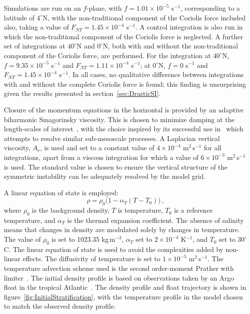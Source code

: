 Simulations are run on an $f$-plane, with $f = 1.01 \times 10 ^{-5}$ s$^{-1}$, corresponding to a latitude of $4^\circ$N, with the non-traditional component of the Coriolis force included also, taking a value of $F_{NT} = 1.45 \times 10^{-4}$ s$^{-1}$. A control integration is also run in which the non-traditional component of the Coriolis force is neglected. A further set of integrations at $40^\circ$N and $0^\circ$N, both with and without the non-traditional component of the Coriolis force, are performed. For the integration at $40^\circ$N, $f = 9.35 \times 10^{-5} $ s$^{-1}$ and $F_{NT} = 1.11 \times 10^{-4}$ s$^{-1}$; at $0^\circ$N, $f = 0$ s$^{-1}$ and $F_{NT} = 1.45 \times 10^{-4}$ s$^{-1}$. In all cases, no qualitative difference between integrations with and without the complete Coriolis force is found; this finding is unsurprising given the results presented in section~\ref{sec:DrasticSI}.

Closure of the momentum equations in the horizontal is provided by an adaptive biharmonic Smagorinsky viscosity. This is chosen to minimize damping at the  length-scales of interest~\citep{Smagorinsky1963, Griffies2000}, with the choice inspired by its successful use in~\citet{Brannigan2016} which attempts to resolve similar sub-mesoscale processes. A Laplacian vertical viscosity, $A_r$, is used and set to a constant value of $4 \times 10^{-4}$ m$^2$\,s$^{-1}$ for all integrations, apart from a viscous integration for which a value of $6 \times 10^{-3}$ m$^2$\,s$^{-1}$ is used. The standard value is chosen to ensure the vertical structure of the symmetric instability can be adequately resolved by the model grid.

A linear equation of state is employed:
\begin{equation}
    \rho = \rho_{0} \big(1 - \alpha_T (T - T_0 )\big) \, ,
    \label{eq:EOS}
\end{equation}
where $\rho_{0}$ is the background density, $T$ is temperature, $T_0$ is a reference temperature, and $\alpha_T$ is the thermal expansion coefficient. The absence of salinity means that changes in density are modulated solely by changes in temperature. The value of $\rho_{0}$ is set to 1023.35 kg$\,$m$^{-3}$, $\alpha_T$  set to $2 \times 10^{-4}$ K$^{-1}$, and $T_0$ set to $30^{\circ}$C. The linear equation of state is used to avoid the complexities added by non-linear effects. The diffusivity of temperature is set to $1 \times 10^{-5}$ m$^2$\,s$^{-1}$. The temperature advection scheme used is the second order-moment Prather with limiter~\citep{Prather1986}. The initial density profile is based on observations taken by an Argo float in the tropical Atlantic~\citep{Argo2019}. The density profile and float trajectory is shown in figure~\ref{fig:InitialStratification}, with the temperature profile in the model chosen to match the observed density profile.

